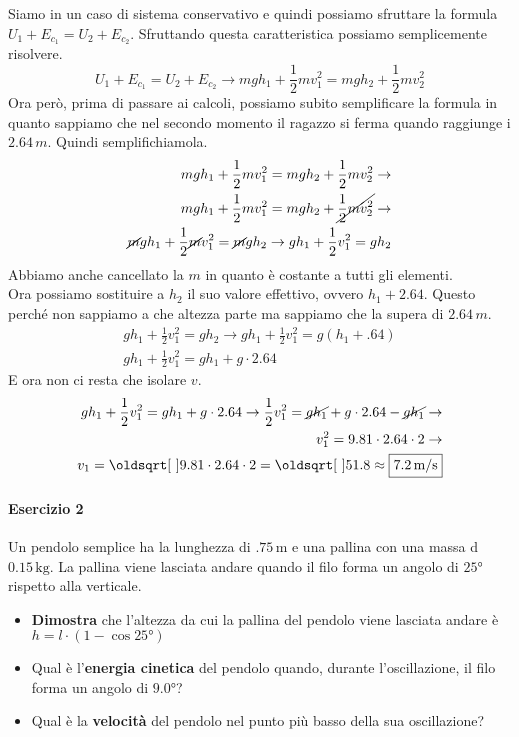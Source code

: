 Siamo in un caso di sistema conservativo e quindi possiamo sfruttare la formula $U_1+E_{c_1} = 
U_2 + E_{c_2}$. Sfruttando questa caratteristica possiamo semplicemente risolvere.
\begin{equation*}
  U_1+E_{c_1} = U_2 + E_{c_2} \rightarrow mgh_1 + \frac{1}{2}mv_1^2 = mgh_2 + \frac{1}{2}mv_2^2
\end{equation*}
Ora però, prima di passare ai calcoli, possiamo subito semplificare la formula in quanto sappiamo
che nel secondo momento il ragazzo si ferma quando raggiunge i $2.64\,m$. Quindi semplifichiamola.
\begin{align*}
  mgh_1 + \frac{1}{2}mv_1^2 = mgh_2 + \frac{1}{2}mv_2^2 \rightarrow \\
  mgh_1 + \frac{1}{2}mv_1^2 = mgh_2 + \cancel{\frac{1}{2}mv_2^2} \rightarrow\\
  \cancel{m}gh_1 + \frac{1}{2}\cancel{m}v_1^2 = \cancel{m}gh_2 \rightarrow
  gh_1 + \frac{1}{2}v_1^2 = gh_2
\end{align*}
Abbiamo anche cancellato la $m$ in quanto è costante a tutti gli elementi.\\
Ora possiamo sostituire a $h_2$ il suo valore effettivo, ovvero $h_1+2.64$. Questo perché non 
sappiamo a che altezza parte ma sappiamo che la supera di $2.64\,m$.
\begin{align*}
  gh_1 + \frac{1}{2}v_1^2 = gh_2 \rightarrow gh_1 + \frac{1}{2}v_1^2 = g\left(h_1+.64\right)\\
  gh_1 + \frac{1}{2}v_1^2 = gh_1 + g\cdot2.64
\end{align*}
E ora non ci resta che isolare $v$.
\begin{align*}
  gh_1 + \frac{1}{2}v_1^2 = gh_1 + g\cdot2.64 \rightarrow
  \frac{1}{2}v_1^2 = \cancel{gh_1} + g\cdot2.64 -\cancel{gh_1} \rightarrow\\
  v_1^2 = 9.81\cdot2.64\cdot2 \rightarrow\\
  v_1 = \sqrt{9.81\cdot2.64\cdot2} = \sqrt{51.8}
  \approx\boxed{7.2\,\text{m/s}}
\end{align*}

\paragraph{Esercizio 2}
Un pendolo semplice ha la lunghezza di $.75\,\text{m}$ e una pallina con una massa d 
$0.15\,\text{kg}$. La pallina viene lasciata andare quando il filo forma un angolo di $\ang{25}$ 
rispetto alla verticale.
\begin{itemize}[label={$\bullet$}]
  \item \textbf{Dimostra} che l'altezza da cui la pallina del pendolo viene lasciata andare è 
    $h=l\cdot(1-\cos\ang{25})$
  \item Qual è l'\textbf{energia cinetica} del pendolo quando, durante l'oscillazione, il filo 
    forma un angolo di $\ang{9.0}$?
  \item Qual è la \textbf{velocità} del pendolo nel punto più basso della sua oscillazione?
\end{itemize}

